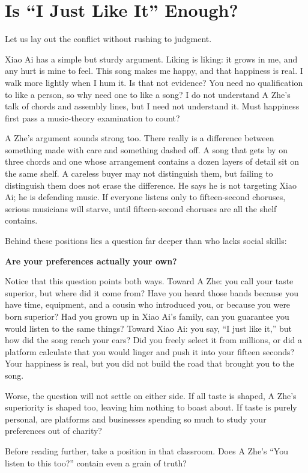 \section{Is ``I Just Like It'' Enough?}
Let us lay out the conflict without rushing to judgment.

Xiao Ai has a simple but sturdy argument. Liking is liking: it grows in me, and any hurt is mine to feel. This song makes me happy, and that happiness is real. I walk more lightly when I hum it. Is that not evidence? You need no qualification to like a person, so why need one to like a song? I do not understand A Zhe's talk of chords and assembly lines, but I need not understand it. Must happiness first pass a music-theory examination to count?

A Zhe's argument sounds strong too. There really is a difference between something made with care and something dashed off. A song that gets by on three chords and one whose arrangement contains a dozen layers of detail sit on the same shelf. A careless buyer may not distinguish them, but failing to distinguish them does not erase the difference. He says he is not targeting Xiao Ai; he is defending music. If everyone listens only to fifteen-second choruses, serious musicians will starve, until fifteen-second choruses are all the shelf contains.

Behind these positions lies a question far deeper than who lacks social skills:

\textbf{Are your preferences actually your own?}

Notice that this question points both ways. Toward A Zhe: you call your taste superior, but where did it come from? Have you heard those bands because you have time, equipment, and a cousin who introduced you, or because you were born superior? Had you grown up in Xiao Ai's family, can you guarantee you would listen to the same things? Toward Xiao Ai: you say, ``I just like it,'' but how did the song reach your ears? Did you freely select it from millions, or did a platform calculate that you would linger and push it into your fifteen seconds? Your happiness is real, but you did not build the road that brought you to the song.

Worse, the question will not settle on either side. If all taste is shaped, A Zhe's superiority is shaped too, leaving him nothing to boast about. If taste is purely personal, are platforms and businesses spending so much to study your preferences out of charity?

Before reading further, take a position in that classroom. Does A Zhe's ``You listen to this too?'' contain even a grain of truth?

